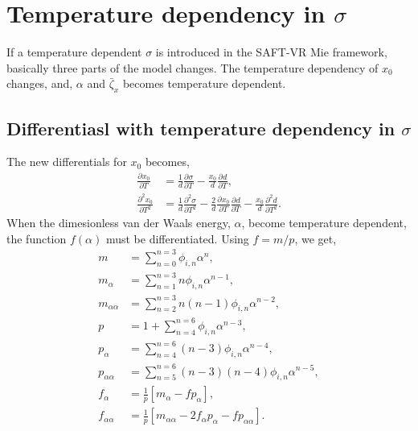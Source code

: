 \documentclass[english]{../thermomemo/thermomemo}
\newcommand*{\pd}[3][]{\frac{\partial^{#1}#2}{\partial{#3}^{#1}}}%
\newcommand*{\lb}{\left(}
\newcommand*{\rb}{\right)}
\newcommand{\zb}{\bar{\zeta}}
\begin{document}
\section{Temperature dependency in $\sigma$}
If a temperature dependent $\sigma$ is introduced in the SAFT-VR Mie framework, basically three parts of the model changes. The temperature dependency of $x_0$ changes, and, $\alpha$ and $\zb_x$ becomes temperature dependent.
\subsection{Differentiasl with temperature dependency in $\sigma$}
The new differentials for $x_0$ becomes,
\begin{align}
  \label{eq:x0_diff_sigma_T}
  \pd{x_0}{T} &= \frac{1}{d}\pd{\sigma}{T} - \frac{x_0}{d}\pd{d}{T},\\
  \pd[2]{x_0}{T} &= \frac{1}{d}\pd[2]{\sigma}{T} -\frac{2}{d}\pd{x_0}{T}\pd{d}{T} -\frac{x_0}{d}\pd[2]{d}{T}.
\end{align}
When the dimesionless van der Waals energy, $\alpha$, become
temperature dependent, the function $f\lb\alpha\rb$ must be
differentiated. Using $f=m/p$, we get,
\begin{align}
  \label{eq:f_diff_alpha}
  m &= \sum_{n=0}^{n=3} \phi_{i,n} \alpha^n,\\
  m_{\alpha} &= \sum_{n=1}^{n=3} n \phi_{i,n} \alpha^{n-1},\\
  m_{\alpha\alpha} &= \sum_{n=2}^{n=3} n \lb n-1 \rb \phi_{i,n} \alpha^{n-2},\\
  p &= 1 + \sum_{n=4}^{n=6} \phi_{i,n} \alpha^{n-3},\\
  p_{\alpha} &= \sum_{n=4}^{n=6} \lb n-3 \rb \phi_{i,n} \alpha^{n-4},\\
  p_{\alpha\alpha} &= \sum_{n=5}^{n=6} \lb n-3 \rb \lb n-4 \rb \phi_{i,n} \alpha^{n-5},\\
  f_{\alpha} &= \frac{1}{p} \left[ m_{\alpha} - f p_{\alpha} \right],\\
  f_{\alpha\alpha} &= \frac{1}{p} \left[ m_{\alpha\alpha} - 2 f_{\alpha} p_{\alpha} - f p_{\alpha\alpha} \right].
\end{align}
\end{document}
